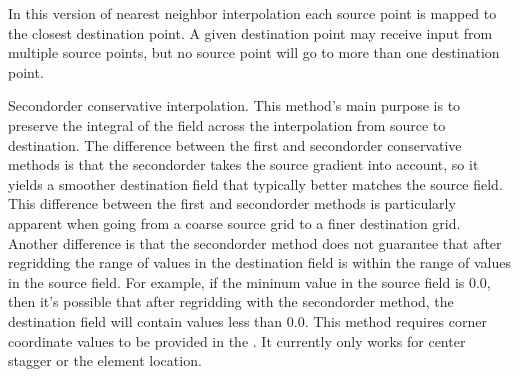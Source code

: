 \documentclass[letterpaper,10pt,english]{sphinxmanual}
\begin{document}
\begin{fulllineitems}

\begin{fulllineitems}
\label{\detokenize{RegridMethod:ESMF.api.constants.RegridMethod.NEAREST_DTOS}}
In this version of nearest neighbor interpolation each source point is 
mapped to the closest destination point. A given destination point may 
receive input from multiple source points, but no source point will go to 
more than one destination point.

\end{fulllineitems}


\begin{fulllineitems}
\label{\detokenize{RegridMethod:ESMF.api.constants.RegridMethod.CONSERVE_2ND}}
Second\sphinxhyphen{}order conservative interpolation. This method’s main purpose is to 
preserve the integral of the field across the interpolation from source to 
destination. The difference between the first and second\sphinxhyphen{}order conservative 
methods is that the second\sphinxhyphen{}order takes the source gradient into account, so 
it yields a smoother destination field that typically better matches the 
source field. This difference between the first and second\sphinxhyphen{}order methods is 
particularly apparent when going from a coarse source grid to a finer 
destination grid. Another difference is that the second\sphinxhyphen{}order method does 
not guarantee that after regridding the range of values in the destination 
field is within the range of values in the source field. For example, if the 
mininum value in the source field is 0.0, then it’s possible that after 
regridding with the second\sphinxhyphen{}order method, the destination field will contain 
values less than 0.0. This method requires corner coordinate values to be 
provided in the {\hyperref[\detokenize{grid:ESMF.api.grid.Grid}]{}}. It currently only works for 
 center stagger or 
the {\hyperref[\detokenize{mesh:ESMF.api.mesh.Mesh}]{}} element location.

\end{fulllineitems}


\end{fulllineitems}
\end{document}
